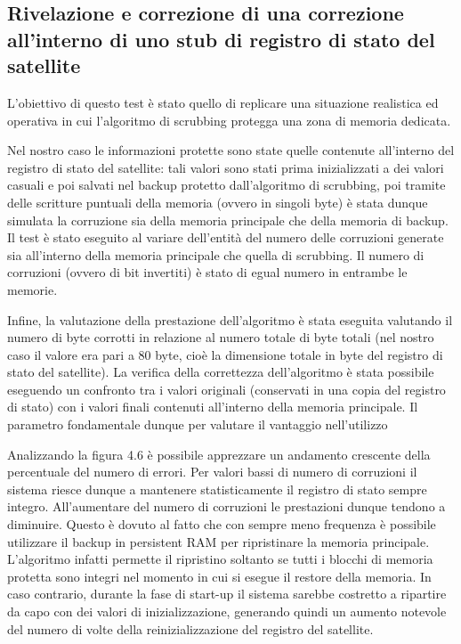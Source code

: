 \documentclass[LaM,binding=0.6cm]{../sapthesis}
\begin{document}
\subsection{Rivelazione e correzione di una correzione all'interno di uno stub di registro di stato del satellite}

L'obiettivo di questo test è stato quello di replicare una situazione realistica ed operativa in cui l'algoritmo di scrubbing protegga una zona di memoria dedicata. 

Nel nostro caso le informazioni protette sono state quelle contenute all'interno del registro di stato del satellite: tali valori sono stati prima inizializzati a dei valori casuali e poi salvati nel backup protetto dall'algoritmo di scrubbing, poi tramite delle scritture puntuali della memoria (ovvero in singoli byte) è stata dunque simulata la corruzione sia della memoria principale che della memoria di backup. \newline\newline
Il test è stato eseguito al variare dell'entità del numero delle corruzioni generate sia all'interno della memoria principale che quella di scrubbing. Il numero di corruzioni (ovvero di bit invertiti) è stato di egual numero in entrambe le memorie.

Infine, la valutazione della prestazione dell'algoritmo è stata eseguita valutando il numero di byte corrotti in relazione al numero totale di byte totali (nel nostro caso il valore era pari a 80 byte, cioè la dimensione totale in byte del registro di stato del satellite). 
La verifica della correttezza dell'algoritmo è stata possibile eseguendo un confronto tra i valori originali (conservati in una copia del registro di stato) con i valori finali contenuti all'interno della memoria principale. Il parametro fondamentale dunque per valutare il vantaggio nell'utilizzo 

\newpage

Analizzando la figura 4.6 è possibile apprezzare un andamento crescente della percentuale del numero di errori. Per valori bassi di numero di corruzioni il sistema riesce dunque a mantenere statisticamente il registro di stato sempre integro. All'aumentare del numero di corruzioni le prestazioni dunque tendono a diminuire. Questo è dovuto al fatto che con sempre meno frequenza è possibile utilizzare il backup in persistent RAM per ripristinare la memoria principale. L'algoritmo infatti permette il ripristino soltanto se tutti i blocchi di memoria protetta sono integri nel momento in cui si esegue il restore della memoria. In caso contrario, durante la fase di start-up il sistema sarebbe costretto a ripartire da capo con dei valori di inizializzazione, generando quindi un aumento notevole del numero di volte della reinizializzazione del registro del satellite. 
\end{document}
